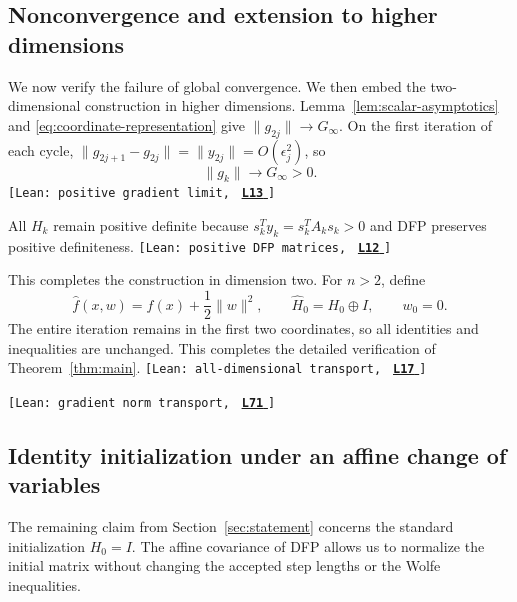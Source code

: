 \documentclass[11pt]{article}
\newcommand{\leanLinkText}[1]{%
  \underline{\textbf{#1}}%
}
\newcommand{\leanSnapshot}{e308927f5b7930bdd002f0c0e42b9d112ad821cb}
\newcommand{\leanClaimTag}[3]{%
  {\footnotesize\texttt{[Lean: #1, }}%
  \href{https://github.com/imathwy/DFP_wolfe_local/blob/\leanSnapshot/#2?plain=1\#L#3}%
    {\leanLinkText{\footnotesize\texttt{L#3}}}%
  {\footnotesize\texttt{]}}\enspace
}
\begin{document}
\subsection{Nonconvergence and extension to higher dimensions}

We now verify the failure of global convergence.  We then embed the
two-dimensional construction in higher dimensions.
Lemma~\ref{lem:scalar-asymptotics} and
\eqref{eq:coordinate-representation} give $\|g_{2j}\|\to G_\infty$.  On the
first iteration of each cycle,
$\|g_{2j+1}-g_{2j}\|=\|y_{2j}\|=O(\epsilon_j^2)$, so
\[
\|g_k\|\longrightarrow G_\infty>0.
\]
\leanClaimTag{positive gradient limit}{DFPWolfe/A_uniformly_convex_counterexample_to_global_convergence_of_DFP_under_weak_Wolfe_/Lemma_6_5_Positive_limiting_gradient_norm_at_every_endpoint.lean}{13}
All $H_k$ remain positive definite because $s_k^Ty_k=s_k^TA_ks_k>0$ and
DFP preserves positive definiteness.
\leanClaimTag{positive DFP matrices}{DFPWolfe/A_uniformly_convex_counterexample_to_global_convergence_of_DFP_under_weak_Wolfe_/Lemma_6_6_Positive_definiteness_of_every_DFP_matrix.lean}{12}
This completes the construction in dimension two.  For $n>2$, define
\[
\widehat f(x,w)=f(x)+\frac12\|w\|^2,
\qquad
\widehat H_0=H_0\oplus I,
\qquad w_0=0.
\]
The entire iteration remains in the first two coordinates, so all identities
and inequalities are unchanged.  This completes the detailed verification of Theorem~\ref{thm:main}.
\leanClaimTag{all-dimensional transport}{DFPWolfe/A_uniformly_convex_counterexample_to_global_convergence_of_DFP_under_weak_Wolfe_/Corollary_6_7_Extension_to_every_dimension_n_ge2.lean}{17}
\leanClaimTag{gradient norm transport}{DFPWolfe/A_uniformly_convex_counterexample_to_global_convergence_of_DFP_under_weak_Wolfe_/Corollary_6_7_Extension_to_every_dimension_n_ge2.lean}{71}

\subsection{Identity initialization under an affine change of variables}

The remaining claim from Section~\ref{sec:statement} concerns the standard
initialization $H_0=I$.  The affine covariance of DFP allows us to normalize
the initial matrix without changing the accepted step lengths or the Wolfe
inequalities.
\end{document}
